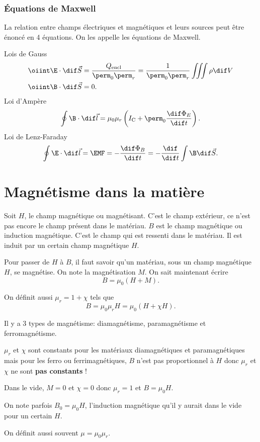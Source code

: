 \section{Équations de Maxwell}
La relation entre champs électriques et magnétiques et
leurs sources peut être énoncé en 4 équations.
On les appelle les équations de Maxwell.

Lois de Gauss
\begin{align*}
  \oiint \E \cdot \dif \vec S &= \frac{Q_\mathrm{encl}}{\perm_0\perm_r}
  = \frac{1}{\perm_0\perm_r}\iiint \rho \dif V\\
  \oiint \B \cdot \dif \vec S &= 0.
\end{align*}
Loi d'Ampère
\[ \oint \B \cdot \dif \vec l =
\mu_0\mu_r \left(I_\mathrm{C} + \perm_0 \frac{\dif \Phi_E}{\dif t}\right). \]
Loi de Lenz-Faraday
\[ \oint \E \cdot \dif \vec l = \EMF = - \frac{\dif \Phi_B}{\dif t}
= - \frac{\dif}{\dif t}\int \B \dif \vec S. \]

\part{Magnétisme dans la matière}
Soit $H$, le champ magnétique ou magnétisant.
C'est le champ extérieur,
ce n'est pas encore le champ présent dans le matériau.
$B$ est le champ magnétique ou induction magnétique.
C'est le champ qui est ressenti dans le matériau.
Il est induit par un certain champ magnétique $H$.

Pour passer de $H$ à $B$,
il faut savoir qu'un matériau,
sous un champ magnétique $H$, se magnétise.
On note la magnétisation $M$.
On sait maintenant écrire
\[ B = \mu_0 (H + M). \]

On définit aussi $\mu_r = 1 + \chi$ tels que
\[ B = \mu_0\mu_r H = \mu_0 (H + \chi H). \]

Il y a 3 types de magnétisme: diamagnétisme, paramagnétisme et ferromagnétisme.

$\mu_r$ et $\chi$ sont constants pour les matériaux diamagnétiques et
paramagnétiques mais pour les ferro ou ferrimagnétiques,
$B$ n'est pas proportionnel à $H$ donc
$\mu_r$ et $\chi$ ne sont \textbf{pas constants} !

Dans le vide, $M = 0$ et $\chi = 0$ donc $\mu_r = 1$ et $B = \mu_0 H$.

On note parfois $B_0 = \mu_0 H$,
l'induction magnétique qu'il y aurait dans le vide pour un certain $H$.

On définit aussi souvent $\mu = \mu_0 \mu_r$.

